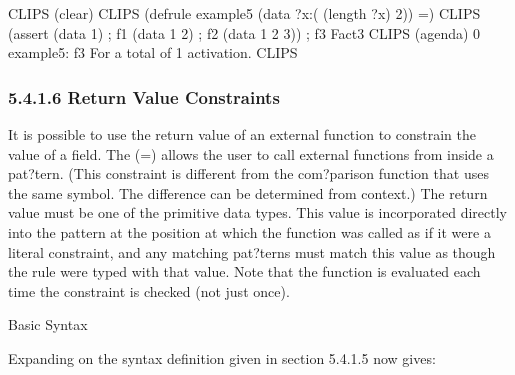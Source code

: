 \documentclass[letterpaper,10pt,english]{sphinxmanual}
\begin{document}
\begin{sphinxVerbatim}[commandchars=\\\{\}]
CLIPS\PYGZgt{} (clear)
CLIPS\PYGZgt{}
(defrule example\PYGZhy{}5
  (data \PYGZdl{}?x\PYGZam{}:(\PYGZgt{} (length\PYGZdl{} ?x) 2))
  =\PYGZgt{})
CLIPS\PYGZgt{} (assert (data 1) ; f\PYGZhy{}1
(data 1 2) ; f\PYGZhy{}2
(data 1 2 3)) ; f\PYGZhy{}3
\PYGZlt{}Fact\PYGZhy{}3\PYGZgt{}
CLIPS\PYGZgt{} (agenda)
0 example\PYGZhy{}5: f\PYGZhy{}3
For a total of 1 activation.
CLIPS\PYGZgt{}
\end{sphinxVerbatim}


\subsubsection{5.4.1.6 Return Value Constraints}
\label{\detokenize{defrule:return-value-constraints}}
It is possible to use the return value of an external function to
constrain the value of a field. The  (=)
allows the user to call external functions from inside a pat?tern. (This
constraint is different from the com?parison function that uses the same
symbol. The difference can be determined from context.) The return value
must be one of the primitive data types. This value is incorporated
directly into the pattern at the position at which the function was
called as if it were a literal constraint, and any matching pat?terns
must match this value as though the rule were typed with that value.
Note that the function is evaluated each time the constraint is checked
(not just once).

Basic Syntax

\begin{sphinxVerbatim}[commandchars=\\\{\}]
\end{sphinxVerbatim}

Expanding on the syntax definition given in section 5.4.1.5 now gives:


\begin{sphinxVerbatim}[commandchars=\\\{\}]
   
 
 
 
\end{sphinxVerbatim}
\end{document}
